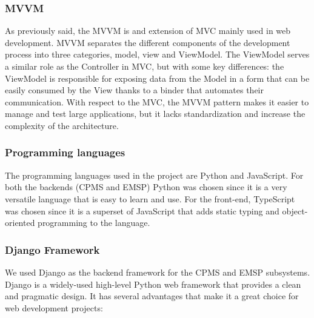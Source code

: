 \documentclass[table, 12pt]{article}
\begin{document}
\subsubsection*{MVVM}
As previously said, the MVVM is and extension of MVC mainly used in web development.
MVVM separates the different components of the development process into three categories, model, view and ViewModel.
The ViewModel serves a similar role as the Controller in MVC, but with some key differences: the ViewModel is responsible for exposing data from the Model in a form that can be easily consumed by the View thanks to a binder that automates their communication.
With respect to the MVC, the MVVM pattern makes it easier to manage and test large applications, but it lacks standardization and increase the complexity of the architecture.

\subsubsection{Programming languages}
The programming languages used in the project are Python and JavaScript. For both the backends (CPMS and EMSP) Python was chosen since it is a very versatile language that is easy to learn and use.
For the front-end, TypeScript was chosen since it is a superset of JavaScript that adds static typing and object-oriented programming to the language. 

\subsubsection{Django Framework}
We used Django as the backend framework for the CPMS and EMSP subsystems.
Django is a widely-used high-level Python web framework that provides a clean and pragmatic design. It has several advantages that make it a great choice for web development projects:
\end{document}
